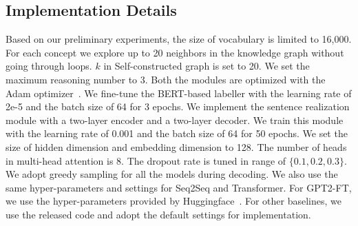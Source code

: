 \documentclass[letterpaper]{article} %
\begin{document}
\subsection{Implementation Details}
Based on our preliminary experiments, 
 the size of vocabulary is limited to 16,000. For each concept we explore up to 20 neighbors in the knowledge graph without going through loops. $k$ in Self-constructed graph is set to 20. We set the maximum reasoning number to 3. Both the modules are optimized with the Adam  optimizer~\cite{kingma-ba:adam}.
We fine-tune the BERT-based labeller with  the learning rate of 2e-5 and the batch size of 64 for 3 epochs. 
We implement the sentence realization module with a two-layer encoder and a two-layer decoder. We train this module with the learning rate of 0.001 and the batch size of 64 for 50 epochs.
We set the size of hidden dimension and embedding dimension to 128.
The number of heads in multi-head attention is 8.
The dropout rate is tuned in range of $\{0.1, 0.2, 0.3\}$.
We adopt greedy sampling for all the models during decoding. 
We also use the same hyper-parameters and settings for Seq2Seq and Transformer.
For GPT2-FT, we use the hyper-parameters provided by Huggingface~\cite{wolf-et-al:huggingface}. For other baselines, we use the released code and adopt the default settings for implementation.

\begin{table}[t!]
  \centering
  \small
  \caption{Dataset statistics. ``Avg. \#w'' and ``Avg. \#s'' are the average amounts of word and sentence per text, respectively. ``Train'', ``Dev'', and ``Test'' are the sizes of the training set, development set, and test set.  }
  \label{tab:dataset}
  \end{table}
\end{document}
